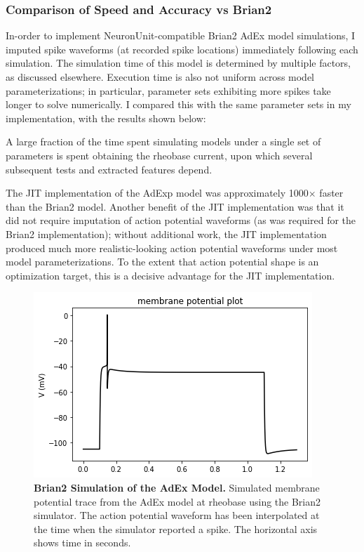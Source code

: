 \subsubsection{Comparison of Speed and Accuracy vs Brian2}
In-order to implement NeuronUnit-compatible Brian2 AdEx model simulations, I imputed spike waveforms (at recorded spike locations) immediately following each simulation.
The simulation time of this model is determined by multiple factors, as discussed elsewhere. Execution time is also not uniform across model parameterizations; in particular, parameter sets exhibiting more spikes take longer to solve numerically.
I compared this with the same parameter sets in my implementation, with the results shown below:

A large fraction of the time spent simulating models under a single set of parameters is spent obtaining the rheobase current, upon which several subsequent tests and extracted features depend.

The JIT implementation of the AdExp model was approximately 1000$\times$ faster than the Brian2 model.
Another benefit of the JIT implementation was that it did not require imputation of action potential waveforms (as was required for the Brian2 implementation); without additional work, the JIT implementation produced much more realistic-looking action potential waveforms under most model parameterizations.
To the extent that action potential shape is an optimization target, this is a decisive advantage for the JIT implementation.

\begin{figure}[!htb]
\begin{center}
\includegraphics[scale=0.7]{figures/backend_check_files/backend_check_12_10.png}
\caption[Brian2 simulation of the AdEx Model]{\textbf{Brian2 Simulation of the AdEx Model.} Simulated membrane potential trace from the AdEx model at rheobase using the Brian2 simulator. The action potential waveform has been interpolated at the time when the simulator reported a spike.
The horizontal axis shows time in seconds.}
\label{fig:AdEx-Brian2-sim}
\end{center}
\end{figure}

